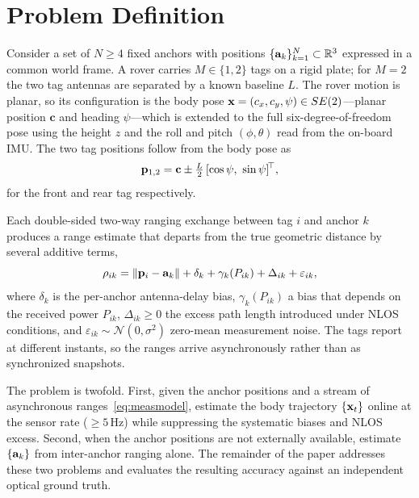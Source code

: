 \section{Problem Definition}
\label{sec:problem}

Consider a set of $N\!\ge\!4$ fixed anchors with positions
$\{\mathbf{a}_k\}_{k=1}^{N}\subset\mathbb{R}^3$ expressed in a common world
frame. A rover carries $M\in\{1,2\}$ tags on a rigid plate; for $M{=}2$
the two tag antennas are separated by a known baseline $L$. The rover
motion is planar, so its configuration is the body pose
$\mathbf{x}=(c_x,c_y,\psi)\in SE(2)$---planar position $\mathbf{c}$ and
heading $\psi$---which is extended to the full six-degree-of-freedom
pose using the height $z$ and the roll and pitch $(\phi,\theta)$ read
from the on-board IMU. The two tag positions follow from the body pose
as
\begin{equation}
  \mathbf{p}_{1,2} = \mathbf{c} \pm \tfrac{L}{2}\,[\cos\psi,\ \sin\psi]^{\!\top},
  \label{eq:rigid}
\end{equation}
for the front and rear tag respectively.

Each double-sided two-way ranging exchange between tag $i$ and anchor
$k$ produces a range estimate that departs from the true geometric
distance by several additive terms,
\begin{equation}
  \rho_{ik} = \lVert \mathbf{p}_i - \mathbf{a}_k \rVert
            + \delta_k + \gamma_k(P_{ik}) + \Delta_{ik} + \varepsilon_{ik},
  \label{eq:measmodel}
\end{equation}
where $\delta_k$ is the per-anchor antenna-delay bias, $\gamma_k(P_{ik})$
a bias that depends on the received power $P_{ik}$, $\Delta_{ik}\ge 0$
the excess path length introduced under NLOS conditions, and
$\varepsilon_{ik}\sim\mathcal{N}(0,\sigma^2)$ zero-mean measurement
noise. The tags report at different instants, so the ranges arrive
asynchronously rather than as synchronized snapshots.

The problem is twofold. First, given the anchor positions and a stream
of asynchronous ranges~\eqref{eq:measmodel}, estimate the body
trajectory $\{\mathbf{x}_t\}$ online at the sensor rate ($\ge\!5$\,Hz) while
suppressing the systematic biases and NLOS excess. Second, when the
anchor positions are not externally available, estimate
$\{\mathbf{a}_k\}$ from inter-anchor ranging alone. The remainder of the
paper addresses these two problems and evaluates the resulting accuracy
against an independent optical ground truth.
